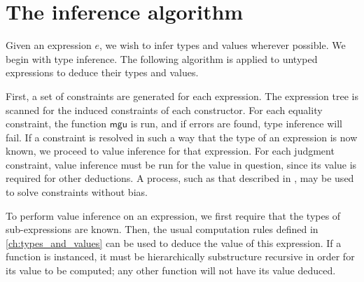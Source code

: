 \documentclass[11pt]{book}
\begin{document}
\section{The inference algorithm}

Given an expression \( e \), we wish to infer types and values wherever possible.
We begin with type inference.
The following algorithm is applied to untyped expressions to deduce their types and values.

First, a set of constraints are generated for each expression.
The expression tree is scanned for the induced constraints of each constructor.
For each equality constraint, the function \( \mathsf{mgu} \) is run, and if errors are found, type inference will fail.
If a constraint is resolved in such a way that the type of an expression is now known, we proceed to value inference for that expression.
For each judgment constraint, value inference must be run for the value in question, since its value is required for other deductions.
A process, such as that described in \cite{Heeren02generalizinghindley-milner}, may be used to solve constraints without bias.

To perform value inference on an expression, we first require that the types of sub-expressions are known.
Then, the usual computation rules defined in \cref{ch:types_and_values} can be used to deduce the value of this expression.
If a function is instanced, it must be hierarchically substructure recursive in order for its value to be computed; any other function will not have its value deduced.



\iffalse{}

\begin{appendices}
    \appendixpage
    \noappendicestocpagenum
    \addappheadtotoc

    \chapter{Type theory formalisation reference}
    \label{ch:formalisation_reference}

    For the purposes of discussion, we present many of the rules listed in `Homotopy Type Theory' \cite{hottbook}.

    
\end{appendices}

\fi{}

\backmatter

\printbibliography
\end{document}
